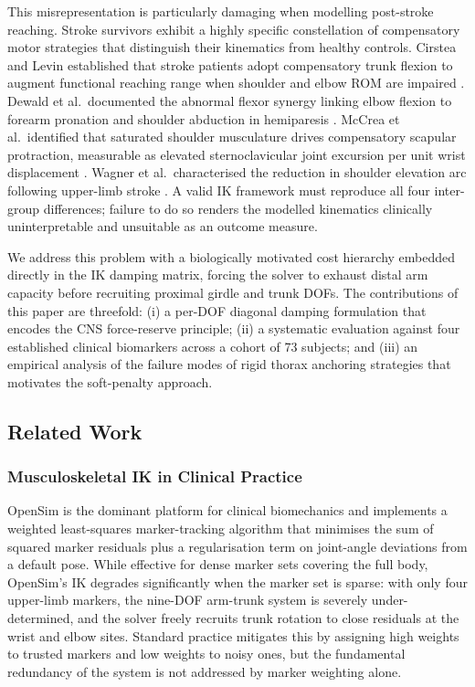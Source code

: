 \documentclass[journal,10pt,twocolumn]{IEEEtran}
\begin{document}
This misrepresentation is particularly damaging when modelling post-stroke
reaching. Stroke survivors exhibit a highly specific constellation of compensatory
motor strategies that distinguish their kinematics from healthy controls.
Cirstea and Levin established that stroke patients adopt compensatory trunk
flexion to augment functional reaching range when shoulder and elbow ROM are
impaired \cite{cirstea2000}. Dewald et al.\ documented the abnormal flexor
synergy linking elbow flexion to forearm pronation and shoulder abduction in
hemiparesis \cite{dewald1995}. McCrea et al.\ identified that saturated shoulder
musculature drives compensatory scapular protraction, measurable as elevated
sternoclavicular joint excursion per unit wrist displacement \cite{mccrea2005}.
Wagner et al.\ characterised the reduction in shoulder elevation arc following
upper-limb stroke \cite{wagner2007}. A valid IK framework must reproduce all four
inter-group differences; failure to do so renders the modelled kinematics
clinically uninterpretable and unsuitable as an outcome measure.

We address this problem with a biologically motivated cost hierarchy embedded
directly in the IK damping matrix, forcing the solver to exhaust distal arm
capacity before recruiting proximal girdle and trunk DOFs. The contributions of
this paper are threefold: (i) a per-DOF diagonal damping formulation that
encodes the CNS force-reserve principle; (ii) a systematic evaluation against
four established clinical biomarkers across a cohort of 73 subjects; and (iii)
an empirical analysis of the failure modes of rigid thorax anchoring strategies
that motivates the soft-penalty approach.

\subsection{Related Work}

\subsubsection{Musculoskeletal IK in Clinical Practice}

OpenSim \cite{delp2007} is the dominant platform for clinical biomechanics
and implements a weighted least-squares marker-tracking algorithm that minimises
the sum of squared marker residuals plus a regularisation term on joint-angle
deviations from a default pose. While effective for dense marker sets covering
the full body, OpenSim's IK degrades significantly when the marker set is
sparse: with only four upper-limb markers, the nine-DOF arm-trunk system is
severely under-determined, and the solver freely recruits trunk rotation to
close residuals at the wrist and elbow sites. Standard practice mitigates this
by assigning high weights to trusted markers and low weights to noisy ones,
but the fundamental redundancy of the system is not addressed by
marker weighting alone.
\end{document}
